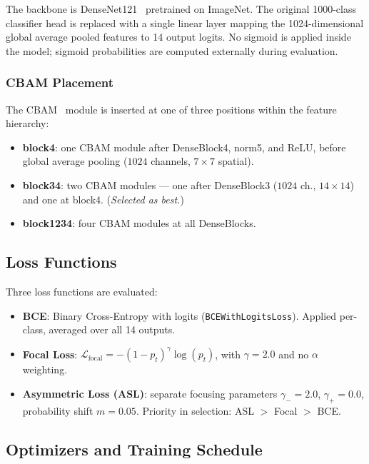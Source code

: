 The backbone is DenseNet121~\cite{rajpurkar2017chexnet} pretrained on ImageNet.
The original 1000-class classifier head is replaced with a single linear layer mapping the 1024-dimensional global average pooled features to 14 output logits.
No sigmoid is applied inside the model; sigmoid probabilities are computed externally during evaluation.

\subsubsection{CBAM Placement}

The CBAM~\cite{woo2018cbam} module is inserted at one of three positions within the feature hierarchy:

\begin{itemize}
  \item \textbf{block4}: one CBAM module after DenseBlock4, norm5, and ReLU, before global average pooling ($1024$ channels, $7{\times}7$ spatial).
  \item \textbf{block34}: two CBAM modules — one after DenseBlock3 ($1024$ ch., $14{\times}14$) and one at block4. (\textit{Selected as best.})
  \item \textbf{block1234}: four CBAM modules at all DenseBlocks.
\end{itemize}

\subsection{Loss Functions}

Three loss functions are evaluated:

\begin{itemize}
  \item \textbf{BCE}: Binary Cross-Entropy with logits (\texttt{BCEWithLogitsLoss}). Applied per-class, averaged over all 14 outputs.
  \item \textbf{Focal Loss}: $\mathcal{L}_\text{focal} = -(1-p_t)^{\gamma} \log(p_t)$, with $\gamma{=}2.0$ and no $\alpha$ weighting.
  \item \textbf{Asymmetric Loss (ASL)}: separate focusing parameters $\gamma_-{=}2.0$, $\gamma_+{=}0.0$, probability shift $m{=}0.05$. Priority in selection: ASL $>$ Focal $>$ BCE.
\end{itemize}

\subsection{Optimizers and Training Schedule}

